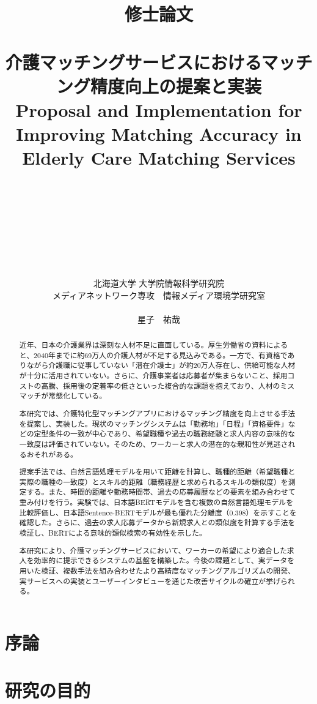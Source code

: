 \documentclass[11pt,a4paper,report,ja=standard,lualatex]{bxjsreport}
\title{\Large 修士論文\\　\\
	\LARGE 介護マッチングサービスにおけるマッチング精度向上の提案と実装\\
	{\small Proposal and Implementation for Improving Matching Accuracy in Elderly Care Matching Services}
	\\　\\　\\　\\　\\
}
\author{\Large 北海道大学 大学院情報科学研究院 \\メディアネットワーク専攻　情報メディア環境学研究室\\　\\\LARGE 星子　祐哉}
\date{}
\begin{document}
\maketitle

\setcounter{tocdepth}{2}
\tableofcontents
\listoffigures
\listoftables

\newpage
{}

\begin{abstract}
近年、日本の介護業界は深刻な人材不足に直面している。厚生労働省の資料によると、2040年までに約69万人の介護人材が不足する見込みである。一方で、有資格でありながら介護職に従事していない「潜在介護士」が約20万人存在し、供給可能な人材が十分に活用されていない。さらに、介護事業者は応募者が集まらないこと、採用コストの高騰、採用後の定着率の低さといった複合的な課題を抱えており、人材のミスマッチが常態化している。

本研究では、介護特化型マッチングアプリにおけるマッチング精度を向上させる手法を提案し、実装した。現状のマッチングシステムは「勤務地」「日程」「資格要件」などの定型条件の一致が中心であり、希望職種や過去の職務経験と求人内容の意味的な一致度は評価されていない。そのため、ワーカーと求人の潜在的な親和性が見逃されるおそれがある。

提案手法では、自然言語処理モデルを用いて距離を計算し、職種的距離（希望職種と実際の職種の一致度）とスキル的距離（職務経歴と求められるスキルの類似度）を測定する。また、時間的距離や勤務時間帯、過去の応募履歴などの要素を組み合わせて重み付けを行う。実験では、日本語BERTモデルを含む複数の自然言語処理モデルを比較評価し、日本語Sentence-BERTモデルが最も優れた分離度（0.398）を示すことを確認した。さらに、過去の求人応募データから新規求人との類似度を計算する手法を検証し、BERTによる意味的類似検索の有効性を示した。

本研究により、介護マッチングサービスにおいて、ワーカーの希望により適合した求人を効率的に提示できるシステムの基盤を構築した。今後の課題として、実データを用いた検証、複数手法を組み合わせたより高精度なマッチングアルゴリズムの開発、実サービスへの実装とユーザーインタビューを通じた改善サイクルの確立が挙げられる。
\end{abstract}

\chapter{序論}%
\label{chap:introduction}


\chapter{研究の目的}
\label{chap:purpose}

\end{document}
